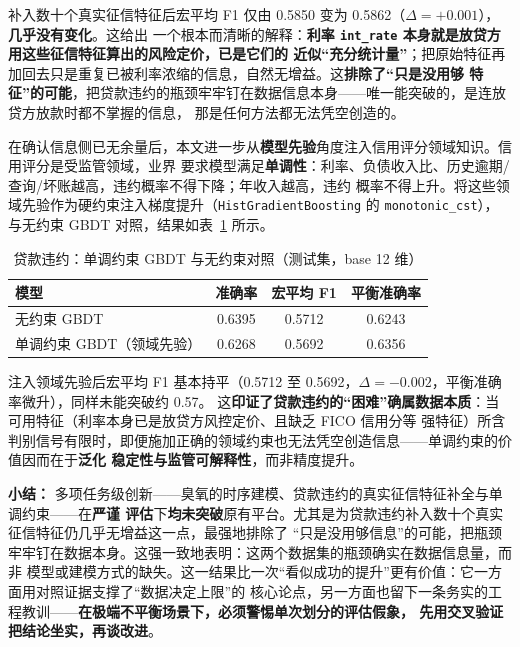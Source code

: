 \documentclass[12pt,a4paper,fontset=fandol]{ctexart}
\numberwithin{figure}{section}
\numberwithin{table}{section}
\numberwithin{equation}{section}
\begin{document}
补入数十个真实征信特征后宏平均 F1 仅由 0.5850 变为 0.5862（$\Delta=+0.001$），\textbf{几乎没有变化}。这给出
一个根本而清晰的解释：\textbf{利率 \texttt{int\_rate} 本身就是放贷方用这些征信特征算出的风险定价，已是它们的
近似“充分统计量”}；把原始特征再加回去只是重复已被利率浓缩的信息，自然无增益。这\textbf{排除了“只是没用够
特征”的可能}，把贷款违约的瓶颈牢牢钉在数据信息本身——唯一能突破的，是连放贷方放款时都不掌握的信息，
那是任何方法都无法凭空创造的。

在确认信息侧已无余量后，本文进一步从\textbf{模型先验}角度注入信用评分领域知识。信用评分是受监管领域，业界
要求模型满足\textbf{单调性}：利率、负债收入比、历史逾期/查询/坏账越高，违约概率不得下降；年收入越高，违约
概率不得上升。将这些领域先验作为硬约束注入梯度提升（\texttt{HistGradientBoosting} 的 \texttt{monotonic\_cst}），
与无约束 GBDT 对照，结果如表~\ref{tab:credit-mono} 所示。

\begin{table}[H]
  \centering
  \caption{贷款违约：单调约束 GBDT 与无约束对照（测试集，base 12 维）}
  \label{tab:credit-mono}
  \begin{tabular}{lccc}
    \toprule
    模型 & 准确率 & 宏平均 F1 & 平衡准确率 \\
    \midrule
    无约束 GBDT & 0.6395 & 0.5712 & 0.6243 \\
    单调约束 GBDT（领域先验） & 0.6268 & 0.5692 & 0.6356 \\
    \bottomrule
  \end{tabular}
\end{table}

注入领域先验后宏平均 F1 基本持平（0.5712 至 0.5692，$\Delta=-0.002$，平衡准确率微升），同样未能突破约 0.57。
这\textbf{印证了贷款违约的“困难”确属数据本质}：当可用特征（利率本身已是放贷方风控定价、且缺乏 FICO 信用分等
强特征）所含判别信号有限时，即便施加正确的领域约束也无法凭空创造信息——单调约束的价值因而在于\textbf{泛化
稳定性与监管可解释性}，而非精度提升。

\textbf{小结：} 多项任务级创新——臭氧的时序建模、贷款违约的真实征信特征补全与单调约束——在\textbf{严谨
评估}下\textbf{均未突破}原有平台。尤其是为贷款违约补入数十个真实征信特征仍几乎无增益这一点，最强地排除了
“只是没用够信息”的可能，把瓶颈牢牢钉在数据本身。这强一致地表明：这两个数据集的瓶颈确实在数据信息量，而非
模型或建模方式的缺失。这一结果比一次“看似成功的提升”更有价值：它一方面用对照证据支撑了“数据决定上限”的
核心论点，另一方面也留下一条务实的工程教训——\textbf{在极端不平衡场景下，必须警惕单次划分的评估假象，
先用交叉验证把结论坐实，再谈改进}。
\end{document}

